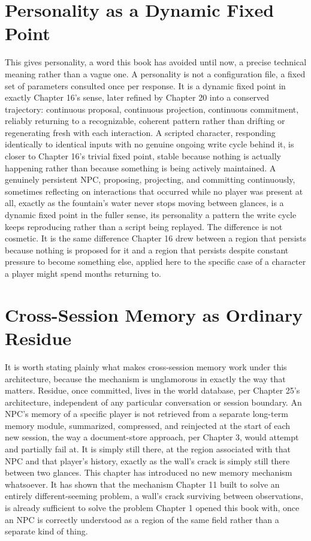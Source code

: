 \section{Personality as a Dynamic Fixed Point}

This gives personality, a word this book has avoided until now, a precise technical meaning rather than a vague one. A personality is not a configuration file, a fixed set of parameters consulted once per response. It is a dynamic fixed point in exactly Chapter 16's sense, later refined by Chapter 20 into a conserved trajectory: continuous proposal, continuous projection, continuous commitment, reliably returning to a recognizable, coherent pattern rather than drifting or regenerating fresh with each interaction. A scripted character, responding identically to identical inputs with no genuine ongoing write cycle behind it, is closer to Chapter 16's trivial fixed point, stable because nothing is actually happening rather than because something is being actively maintained. A genuinely persistent NPC, proposing, projecting, and committing continuously, sometimes reflecting on interactions that occurred while no player was present at all, exactly as the fountain's water never stops moving between glances, is a dynamic fixed point in the fuller sense, its personality a pattern the write cycle keeps reproducing rather than a script being replayed. The difference is not cosmetic. It is the same difference Chapter 16 drew between a region that persists because nothing is proposed for it and a region that persists despite constant pressure to become something else, applied here to the specific case of a character a player might spend months returning to.

\section{Cross-Session Memory as Ordinary Residue}

It is worth stating plainly what makes cross-session memory work under this architecture, because the mechanism is unglamorous in exactly the way that matters. Residue, once committed, lives in the world database, per Chapter 25's architecture, independent of any particular conversation or session boundary. An NPC's memory of a specific player is not retrieved from a separate long-term memory module, summarized, compressed, and reinjected at the start of each new session, the way a document-store approach, per Chapter 3, would attempt and partially fail at. It is simply still there, at the region associated with that NPC and that player's history, exactly as the wall's crack is simply still there between two glances. This chapter has introduced no new memory mechanism whatsoever. It has shown that the mechanism Chapter 11 built to solve an entirely different-seeming problem, a wall's crack surviving between observations, is already sufficient to solve the problem Chapter 1 opened this book with, once an NPC is correctly understood as a region of the same field rather than a separate kind of thing.


